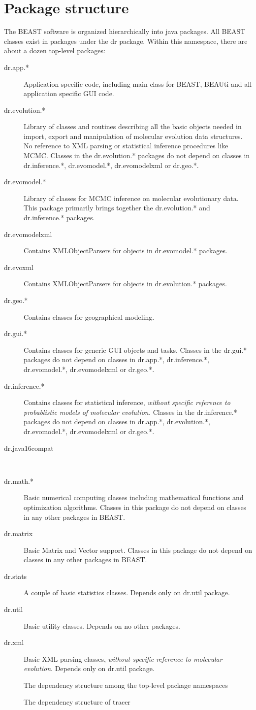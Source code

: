 \documentclass[11pt]{article}
\begin{document}
\section*{Package structure}

The BEAST software is organized hierarchically into java packages.
All BEAST classes exist in packages under the dr package. Within this
namespace, there are about a dozen top-level packages:
\begin{description}
\item [{dr.app.{*}}] Application-specific code, including main class for
BEAST, BEAUti and all application specific GUI code.
\item [{dr.evolution.{*}}] Library of classes and routines describing all
the basic objects needed in import, export and manipulation of molecular
evolution data structures. No reference to XML parsing or statistical
inference procedures like MCMC. Classes in the dr.evolution.{*} packages
do not depend on classes in dr.inference.{*}, dr.evomodel.{*}, dr.evomodelxml
or dr.geo.{*}.
\item [{dr.evomodel.{*}}] Library of classes for MCMC inference on molecular
evolutionary data. This package primarily brings together the dr.evolution.{*}
and dr.inference.{*} packages.
\item [{dr.evomodelxml}] Contains XMLObjectParsers for objects in dr.evomodel.{*}
packages.
\item [{dr.evoxml}] Contains XMLObjectParsers for objects in dr.evolution.{*}
packages.
\item [{dr.geo.{*}}] Contains classes for geographical modeling.
\item [{dr.gui.{*}}] Contains classes for generic GUI objects and tasks.
Classes in the dr.gui.{*} packages do not depend on classes in dr.app.{*},
dr.inference.{*}, dr.evomodel.{*}, dr.evomodelxml or dr.geo.{*}.
\item [{dr.inference.{*}}] Contains classes for statistical inference,
\emph{without specific reference to probablistic models of molecular
evolution. }Classes in the dr.inference.{*} packages do not depend
on classes in dr.app.{*}, dr.evolution.{*}, dr.evomodel.{*}, dr.evomodelxml
or dr.geo.{*}.
\item [{dr.java16compat}]~
\item [{dr.math.{*}}] Basic numerical computing classes including mathematical
functions and optimization algorithms. Classes in this package do
not depend on classes in any other packages in BEAST.
\item [{dr.matrix}] Basic Matrix and Vector support. Classes in this package
do not depend on classes in any other packages in BEAST.
\item [{dr.stats}] A couple of basic statistics classes. Depends only on
dr.util package. 
\item [{dr.util}] Basic utility classes. Depends on no other packages.
\item [{dr.xml}] Basic XML parsing classes, \emph{without specific reference
to molecular evolution}. Depends only on dr.util package. 
\end{description}
%
\begin{figure}

\caption{The dependency structure among the top-level package namespaces}
\end{figure}

\begin{figure}

\caption{The dependency structure of tracer}
\end{figure}
\end{document}

